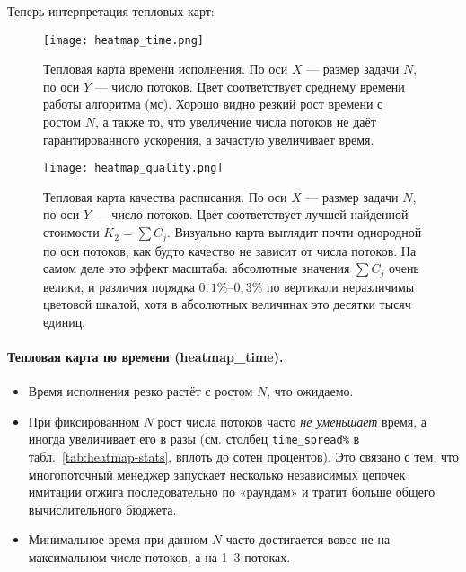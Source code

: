 \documentclass[a4paper,12pt]{article}
\begin{document}
Теперь интерпретация тепловых карт:

\begin{figure}[h!]
    \centering
    \texttt{[image: heatmap\_time.png]}
    \caption{Тепловая карта времени исполнения.
    По оси $X$ --- размер задачи $N$, по оси $Y$ --- число потоков.
    Цвет соответствует среднему времени работы алгоритма (мс).
    Хорошо видно резкий рост времени с ростом $N$, а также то, что увеличение числа потоков
    не даёт гарантированного ускорения, а зачастую увеличивает время.}
\end{figure}

\begin{figure}[h!]
    \centering
    \texttt{[image: heatmap\_quality.png]}
    \caption{Тепловая карта качества расписания.
    По оси $X$ --- размер задачи $N$, по оси $Y$ --- число потоков.
    Цвет соответствует лучшей найденной стоимости $K_2 = \sum C_j$.
    Визуально карта выглядит почти однородной по оси потоков, как будто качество не зависит от числа потоков.
    На самом деле это эффект масштаба: абсолютные значения $\sum C_j$ очень велики, и различия порядка
    $0{,}1\%$--$0{,}3\%$ по вертикали неразличимы цветовой шкалой, хотя в абсолютных величинах
    это десятки тысяч единиц.}
    \label{fig:heatmaps}
\end{figure}


\paragraph{Тепловая карта по времени (heatmap\_time).}
\begin{itemize}
    \item Время исполнения резко растёт с ростом $N$, что ожидаемо.
    \item При фиксированном $N$ рост числа потоков часто \emph{не уменьшает} время, а иногда увеличивает его в разы (см. столбец \texttt{time\_spread\%} в табл.~\ref{tab:heatmap-stats}, вплоть до сотен процентов). Это связано с тем, что многопоточный менеджер запускает несколько независимых цепочек имитации отжига последовательно по «раундам» и тратит больше общего вычислительного бюджета.
    \item Минимальное время при данном $N$ часто достигается вовсе не на максимальном числе потоков, а на 1--3 потоках.
\end{itemize}
\end{document}

